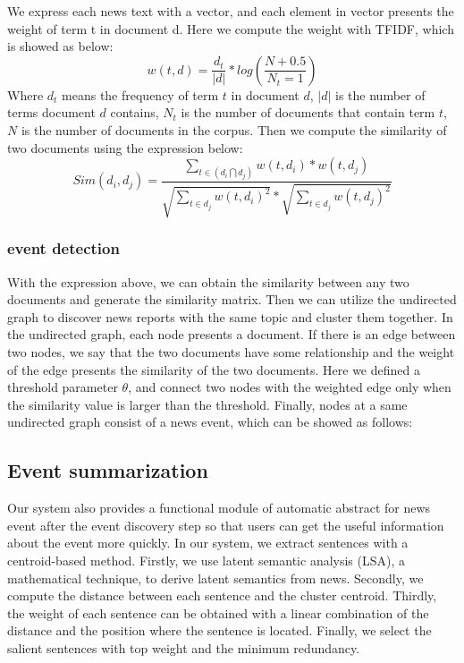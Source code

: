\documentclass[conference]{IEEEtran}
\begin{document}
We express each news text with a vector, and each element in vector presents the weight of term t in document d. Here we compute the weight with TFIDF, which is showed as below:
\begin{equation}
w(t,d) = \frac{d_t}{|d|} * log(\frac{N+0.5}{N_t=1})
\end{equation}
Where $d_t$ means the frequency of term $t$ in document $d$, $| d|$ is the number of terms document $d$ contains, $N_t$ is the number of documents that contain term $t$, $N$ is the number of documents in the corpus.
Then we compute the similarity of two documents using the expression below:
\begin{equation}
Sim(d_i, d_j) =  \frac{\sum_{t \in (d_i \bigcap d_j)}w(t,d_i)*w(t,d_j)}{\sqrt{\sum_{t \in d_j} w(t,d_i)^2 } * \sqrt{\sum_{t \in d_j} w(t,d_j)^2}}
\end{equation}

\subsubsection{event detection}
With the expression above, we can obtain the similarity between any two documents and generate the similarity matrix. Then we can utilize the undirected graph to discover news reports with the same topic and cluster them together. In the undirected graph, each node presents a document. If there is an edge between two nodes, we say that the two documents have some relationship and the weight of the edge presents the similarity of the two documents. Here we defined a threshold parameter $\theta$, and connect two nodes with the weighted edge only when the similarity value is larger than the threshold. Finally, nodes at a same undirected graph consist of a news event, which can be showed as follows:

\subsection{Event summarization}
Our system also provides a functional module of automatic abstract for news event after the event discovery step so that users can get the useful information about the event more quickly. In our system, we extract sentences with a centroid-based method. Firstly, we use latent semantic analysis (LSA), a mathematical technique, to derive latent semantics from news. Secondly, we compute the distance between each sentence and the cluster centroid. Thirdly, the weight of each sentence can be obtained with a linear combination of the distance and the position where the sentence is located. Finally, we select the salient sentences with top weight and the minimum redundancy.
\end{document}
